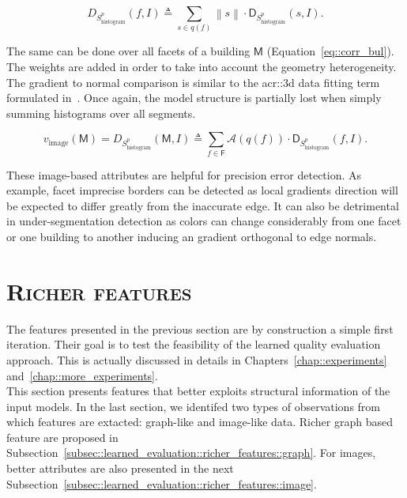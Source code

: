         \begin{equation}
            \label{eq::corr_fac}
            D_{S^p_{\text{histogram}}}\left(f, I\right) \triangleq \sum_{s \in q\left(f\right)} \left\rVert s \right\lVert \cdot \mathsf{D}_{S^p_{\text{histogram}}}(s, I).
        \end{equation}

        The same can be done over all facets of a building $\mathsf{M}$ (Equation~\ref{eq::corr_bul}).
        The weights are added in order to take into account the geometry heterogeneity.
        The gradient to normal comparison is similar to the \gls{acr::3d} data fitting term formulated in~\parencite{li2016manhattan}.
        Once again, the model structure is partially lost when simply summing histograms over all segments.

        \begin{equation}
            \label{eq::corr_bul}
            v_{\text{image}}\left(\mathsf{M}\right) = D_{S^p_{\text{histogram}}}\left(\mathsf{M}, I\right) \triangleq \sum_{f \in \mathsf{F}} \mathscr{A}\left(q\left(f\right)\right) \cdot \mathsf{D}_{S^p_{\text{histogram}}}(f, I).
        \end{equation}
        
        These image-based attributes are helpful for precision error detection.
        As example, facet imprecise borders can be detected as local gradients direction will be expected to differ greatly from the inaccurate edge.
        It can also be detrimental in under-segmentation detection as colors can change considerably from one facet or one building to another inducing an gradient orthogonal to edge normals.

\section{\textsc{Richer features}}
    \label{sec::learned_evaluation::richer_features}
    The features presented in the previous section are by construction a simple first iteration.
    Their goal is to test the feasibility of the learned quality evaluation approach.
    This is actually discussed in details in Chapters~\ref{chap::experiments} and~\ref{chap::more_experiments}.\\

    This section presents features that better exploits structural information of the input models.
    In the last section, we identifed two types of observations from which features are extacted: graph-like and image-like data.
    Richer graph based feature are proposed in Subsection~\ref{subsec::learned_evaluation::richer_features::graph}.
    For images, better attributes are also presented in the next Subsection~\ref{subsec::learned_evaluation::richer_features::image}.


